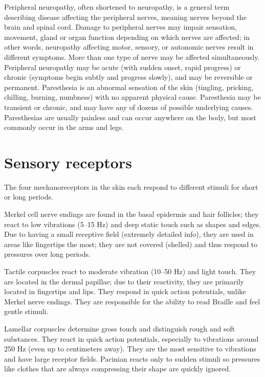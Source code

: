 Peripheral neuropathy, often shortened to neuropathy, is a general term describing disease affecting the peripheral nerves, meaning nerves beyond the brain and spinal cord. Damage to peripheral nerves may impair sensation, movement, gland or organ function depending on which nerves are affected; in other words, neuropathy affecting motor, sensory, or autonomic nerves result in different symptoms. More than one type of nerve may be affected simultaneously. Peripheral neuropathy may be acute (with sudden onset, rapid progress) or chronic (symptoms begin subtly and progress slowly), and may be reversible or permanent. Paresthesia is an abnormal sensation of the skin (tingling, pricking, chilling, burning, numbness) with no apparent physical cause. Paresthesia may be transient or chronic, and may have any of dozens of possible underlying causes. Paresthesias are usually painless and can occur anywhere on the body, but most commonly occur in the arms and legs.

\hypertarget{sensory-receptors}{%
\section{Sensory receptors}\label{sensory-receptors}}

The four mechanoreceptors in the skin each respond to different stimuli for short or long periods.

Merkel cell nerve endings are found in the basal epidermis and hair follicles; they react to low vibrations (5--15 Hz) and deep static touch such as shapes and edges. Due to having a small receptive field (extremely detailed info), they are used in areas like fingertips the most; they are not covered (shelled) and thus respond to pressures over long periods.

Tactile corpuscles react to moderate vibration (10--50 Hz) and light touch. They are located in the dermal papillae; due to their reactivity, they are primarily located in fingertips and lips. They respond in quick action potentials, unlike Merkel nerve endings. They are responsible for the ability to read Braille and feel gentle stimuli.

Lamellar corpuscles determine gross touch and distinguish rough and soft substances. They react in quick action potentials, especially to vibrations around 250 Hz (even up to centimeters away). They are the most sensitive to vibrations and have large receptor fields. Pacinian reacts only to sudden stimuli so pressures like clothes that are always compressing their shape are quickly ignored.

